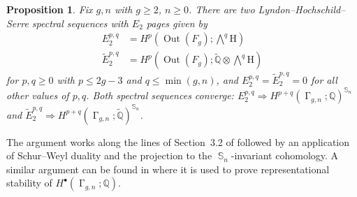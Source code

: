 \documentclass[oneside]{amsart}
\newtheorem{proposition}[theorem]{Proposition}
\theoremstyle{remark}
\newcommand{\Q}{\mathbb{Q}}
\newcommand{\tQ}{\widetilde{\Q}}
\newcommand{\PA}{{\operatorname{\Gamma}}}
\DeclareMathOperator{\SG}{{\mathbb S}}
\newcommand{\Out}{{\operatorname{Out}}}
\begin{document}
\begin{proposition}
\label{prop:spectral}
Fix $g,n$ with $g \geq 2$, $n \geq 0$.
There are two Lyndon--Hochschild--Serre spectral sequences with $E_2$ pages given by
\begin{align*} E_2^{p,q} &= H^p\left(\Out(F_g); \bigwedge\nolimits^q \mathrm H\right) \\
\widetilde {E}_2^{p,q} &= H^p\left(\Out(F_g); \tQ \otimes \bigwedge\nolimits^q \mathrm H\right) \end{align*}
for $p,q \geq 0$ with $p \leq 2g-3$ and $q \leq \min(g,n)$,
and $E_2^{p,q} = \widetilde {E}_2^{p,q} = 0$ for all other values of $p,q$.
Both spectral sequences converge:
$E_2^{p,q} \Rightarrow H^{p+q}(\PA_{g,n};\Q)^{\SG_n}$ and 
$\widetilde {E}_2^{p,q} \Rightarrow H^{p+q}(\PA_{g,n};\tQ)^{\SG_n}$.
\end{proposition}
The argument works along the lines of Section~3.2 of
\cite{conant2016assembling} followed by an application of Schur--Weyl duality and the projection to the $\SG_n$-invariant cohomology.
A similar argument can be found in \cite[Lemma~4.1]{saied2015fi} where it is used to prove representational stability of $H^\bullet(\PA_{g,n};\Q)$. 
\end{document}
